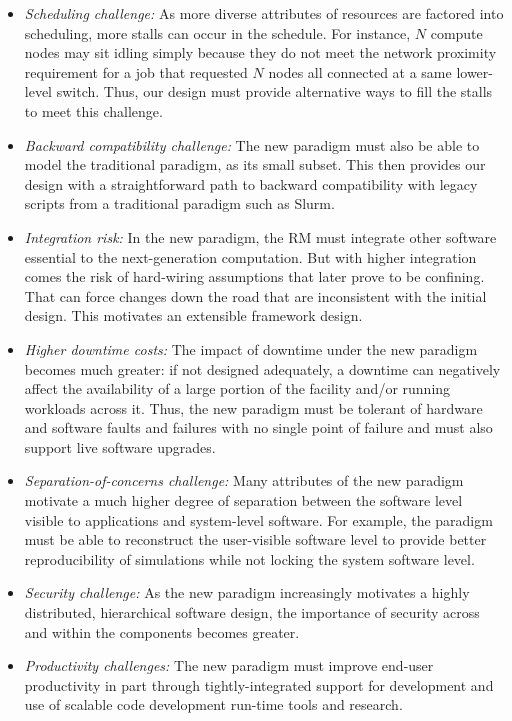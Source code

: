 \documentclass[10pt]{article}
\newcommand{\slurm}{Slurm}
\begin{document}
\begin{itemize}
\item{\sl Scheduling challenge:} As more diverse attributes of resources
      are factored into scheduling, more stalls can occur in the schedule.
      For instance, $N$ compute nodes may sit idling simply because they do not meet
      the network proximity requirement for a job that requested 
      $N$ nodes all connected at a same lower-level switch. Thus, our design 
      must provide alternative ways to fill the stalls to meet this 
      challenge.

\item{\sl Backward compatibility challenge:} The new paradigm must also be
      able to model the traditional paradigm, as its small subset. This
      then provides our design with a straightforward path to 
      backward compatibility with legacy scripts from a traditional 
      paradigm such as \slurm.

\item{\sl Integration risk:} In the new paradigm, the RM must 
     integrate other software essential to the next-generation computation. 
     But with higher integration comes the risk of hard-wiring assumptions
     that later prove to be confining. That can force changes down the road
     that are inconsistent with the initial design. This motivates
     an extensible framework design. 
     
\item{\sl Higher downtime costs:} The impact of downtime under the 
     new paradigm becomes much greater: if not designed adequately, 
     a downtime can negatively affect the availability of
     a large portion of the facility and/or running workloads across it.
     Thus, the new paradigm must be tolerant of hardware and software faults 
     and failures with no single point of failure and must also support 
     live software upgrades.


\item{\sl Separation-of-concerns challenge:} Many attributes of the new
     paradigm motivate a much higher degree of separation between
     the software level visible to applications and system-level 
     software. For example, the paradigm must be able to reconstruct the user-visible
     software level to provide better reproducibility of simulations while not
     locking the system software level. 
   
\item{\sl Security challenge:} As the new paradigm increasingly motivates
     a highly distributed, hierarchical software design, 
     the importance of security across and within the components becomes greater.

\item{\sl Productivity challenges:} The new paradigm must improve end-user 
     productivity in part through tightly-integrated support for development
     and use of scalable code development run-time tools and research.

\end{itemize}
\end{document}
